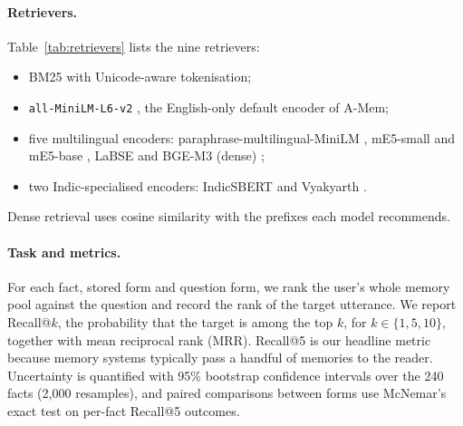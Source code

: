 \paragraph{Retrievers.}
Table~\ref{tab:retrievers} lists the nine retrievers:
\begin{itemize}
\item BM25 \citep{robertson2009bm25} with Unicode-aware tokenisation;
\item \texttt{all-MiniLM-L6-v2} \citep{wang2020minilm,reimers2019sbert}, the English-only default encoder of A-Mem;
\item five multilingual encoders: paraphrase-multilingual-MiniLM \citep{reimers2020multilingual}, mE5-small and mE5-base \citep{wang2024me5}, LaBSE \citep{feng2022labse} and BGE-M3 (dense) \citep{chen2024bgem3};
\item two Indic-specialised encoders: IndicSBERT \citep{deode2023indicsbert} and Vyakyarth \citep{krutrim2025vyakyarth}.
\end{itemize}
Dense retrieval uses cosine similarity with the prefixes each model recommends.



\paragraph{Task and metrics.}
For each fact, stored form and question form, we rank the user's whole memory pool against the question and record the rank of the target utterance. We report Recall@$k$, the probability that the target is among the top $k$, for $k\in\{1,5,10\}$, together with mean reciprocal rank (MRR). Recall@5 is our headline metric because memory systems typically pass a handful of memories to the reader. Uncertainty is quantified with 95\% bootstrap confidence intervals over the 240 facts (2{,}000 resamples), and paired comparisons between forms use McNemar's exact test on per-fact Recall@5 outcomes.

